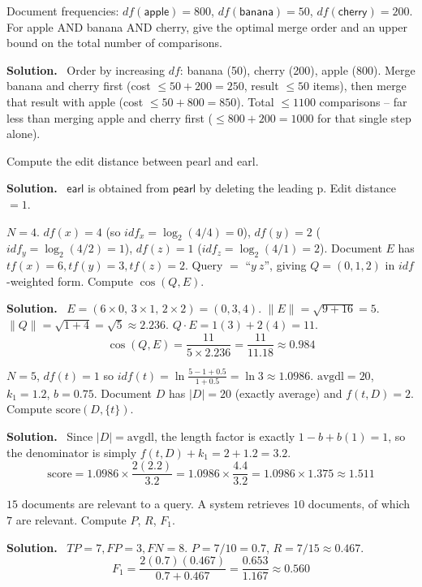 \documentclass[11pt, a4paper]{article}
\newcommand{\Solution}{\medskip\noindent\textbf{\color{exgreen}Solution.}\ }
\begin{document}
\begin{exercisebox}
Document frequencies: $df(\textsf{apple})=800$, $df(\textsf{banana})=50$, $df(\textsf{cherry})=200$. For \textsf{apple AND banana AND cherry}, give the optimal merge order and an upper bound on the total number of comparisons.
\end{exercisebox}
\Solution
Order by increasing $df$: \textsf{banana} (50), \textsf{cherry} (200), \textsf{apple} (800). Merge \textsf{banana} and \textsf{cherry} first (cost $\le 50+200=250$, result $\le50$ items), then merge that result with \textsf{apple} (cost $\le 50+800=850$). Total $\le 1100$ comparisons -- far less than merging \textsf{apple} and \textsf{cherry} first ($\le 800+200=1000$ for that single step alone).

\begin{exercisebox}
Compute the edit distance between \textsf{pearl} and \textsf{earl}.
\end{exercisebox}
\Solution
$\textsf{earl}$ is obtained from $\textsf{pearl}$ by deleting the leading \textsf{p}. Edit distance $=1$.

\begin{exercisebox}
$N=4$. $df(x)=4$ (so $idf_x=\log_2(4/4)=0$), $df(y)=2$ ($idf_y=\log_2(4/2)=1$), $df(z)=1$ ($idf_z=\log_2(4/1)=2$). Document $E$ has $tf(x)=6,tf(y)=3,tf(z)=2$. Query $=$ ``$y\ z$'', giving $Q=(0,1,2)$ in $idf$-weighted form. Compute $\cos(Q,E)$.
\end{exercisebox}
\Solution
$E = (6\times0,\,3\times1,\,2\times2) = (0,3,4)$. $\lVert E\rVert=\sqrt{9+16}=5$. $\lVert Q\rVert=\sqrt{1+4}=\sqrt5\approx2.236$. $Q\cdot E = 1(3)+2(4)=11$.
\[
\cos(Q,E) = \frac{11}{5\times2.236} = \frac{11}{11.18} \approx 0.984
\]

\begin{exercisebox}
$N=5$, $df(t)=1$ so $idf(t)=\ln\frac{5-1+0.5}{1+0.5}=\ln 3\approx1.0986$. $\text{avgdl}=20$, $k_1=1.2$, $b=0.75$. Document $D$ has $|D|=20$ (exactly average) and $f(t,D)=2$. Compute $\text{score}(D,\{t\})$.
\end{exercisebox}
\Solution
Since $|D|=\text{avgdl}$, the length factor is exactly $1-b+b(1)=1$, so the denominator is simply $f(t,D)+k_1 = 2+1.2=3.2$.
\[
\text{score} = 1.0986\times\frac{2(2.2)}{3.2} = 1.0986\times\frac{4.4}{3.2} = 1.0986\times1.375 \approx 1.511
\]

\begin{exercisebox}
$15$ documents are relevant to a query. A system retrieves $10$ documents, of which $7$ are relevant. Compute $P$, $R$, $F_1$.
\end{exercisebox}
\Solution
$TP=7,FP=3,FN=8$. $P=7/10=0.7$, $R=7/15\approx0.467$.
\[
F_1 = \frac{2(0.7)(0.467)}{0.7+0.467} = \frac{0.653}{1.167} \approx 0.560
\]
\end{document}
